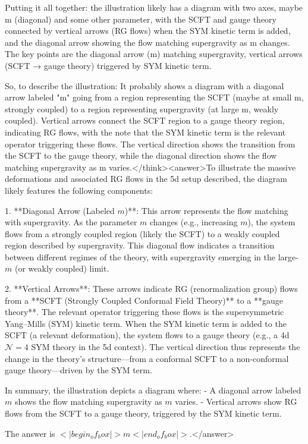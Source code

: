Putting it all together: the illustration likely has a diagram with two axes, maybe m (diagonal) and some other parameter, with the SCFT and gauge theory connected by vertical arrows (RG flows) when the SYM kinetic term is added, and the diagonal arrow showing the flow matching supergravity as m changes. The key points are the diagonal arrow (m) matching supergravity, vertical arrows (SCFT → gauge theory) triggered by SYM kinetic term.

So, to describe the illustration: It probably shows a diagram with a diagonal arrow labeled "m" going from a region representing the SCFT (maybe at small m, strongly coupled) to a region representing supergravity (at large m, weakly coupled). Vertical arrows connect the SCFT region to a gauge theory region, indicating RG flows, with the note that the SYM kinetic term is the relevant operator triggering these flows. The vertical direction shows the transition from the SCFT to the gauge theory, while the diagonal direction shows the flow matching supergravity as m varies.</think><answer>To illustrate the massive deformations and associated RG flows in the 5d setup described, the diagram likely features the following components:  

1. **Diagonal Arrow (Labeled \( m \))**: This arrow represents the flow matching with supergravity. As the parameter \( m \) changes (e.g., increasing \( m \)), the system flows from a strongly coupled region (likely the SCFT) to a weakly coupled region described by supergravity. This diagonal flow indicates a transition between different regimes of the theory, with supergravity emerging in the large-\( m \) (or weakly coupled) limit.  

2. **Vertical Arrows**: These arrows indicate RG (renormalization group) flows from a **SCFT (Strongly Coupled Conformal Field Theory)** to a **gauge theory**. The relevant operator triggering these flows is the supersymmetric Yang–Mills (SYM) kinetic term. When the SYM kinetic term is added to the SCFT (a relevant deformation), the system flows to a gauge theory (e.g., a 4d \( \mathcal{N}=4 \) SYM theory in the 5d context). The vertical direction thus represents the change in the theory’s structure—from a conformal SCFT to a non-conformal gauge theory—driven by the SYM term.  

In summary, the illustration depicts a diagram where:  
- A diagonal arrow labeled \( m \) shows the flow matching supergravity as \( m \) varies.  
- Vertical arrows show RG flows from the SCFT to a gauge theory, triggered by the SYM kinetic term.  

The answer is \(<|begin_of_box|>m<|end_of_box|>\).</answer>